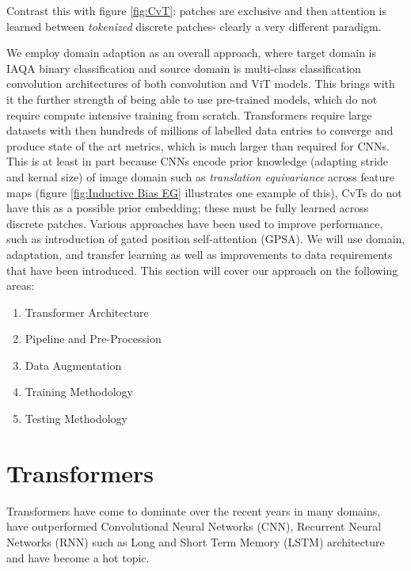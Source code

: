 Contrast this with figure \ref{fig:CvT}: patches are exclusive and then attention is learned between \textit{tokenized} discrete patches- clearly a very different paradigm.

We employ domain adaption as an overall approach, where target domain is IAQA binary classification and source domain is multi-class classification convolution architectures of both convolution and ViT models. This brings with it the further strength of being able to use pre-trained models, which do not require compute intensive training from scratch. Transformers require large datasets\cite{Zhang2021,Kolesnikov2020,DAscoli2021,Khan2021,xiao2021early,Wu2021} with then hundreds of millions of labelled data entries\cite{Zhang2021} to converge and produce state of the art metrics, which is much larger than required for CNNs. This is at least in part because CNNs encode prior knowledge (adapting stride and kernal size) of image domain such as \textit{translation equivariance} \cite{Khan2021} across feature maps (figure \ref{fig:Inductive Bias EG} illustrates one example of this), CvTs do not have this as a possible prior embedding; these must be fully learned across discrete patches. Various approaches have been used to improve performance, such as introduction of gated position self-attention (GPSA)\cite{Touvron2021a,Touvron2020a,DAscoli2021}. We will use domain, adaptation, and transfer learning as well as improvements to data requirements that have been introduced. This section will cover our approach on the following areas: \begin{enumerate}
    \item Transformer Architecture
    \item Pipeline and Pre-Procession
    \item{Data Augmentation}
    \item Training Methodology
    \item Testing Methodology
\end{enumerate}



\section{Transformers}
\label{Transformeres} 
Transformers have come to dominate over the recent years in many domains, have outperformed Convolutional Neural Networks (CNN), Recurrent Neural Networks (RNN) such as Long and Short Term Memory (LSTM) architecture\cite{Vaswani2017a} and have become a hot topic. 

